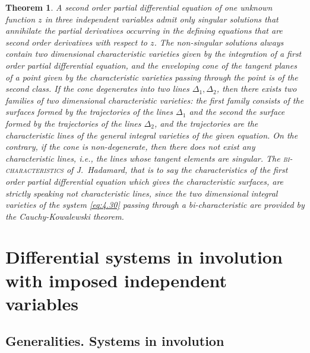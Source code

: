 \documentclass[leqno,11pt]{book}
\numberwithin{equation}{chapter}
\theoremstyle{shape1}
\newtheorem*{thm*}{\hspace{15pt}Theorem}
\theoremstyle{shape0}
\theoremstyle{shape2}
\theoremstyle{definition}
\begin{document}
\begin{thm*}
  A second order partial differential equation of one unknown function $z$ in three independent variables admit only singular solutions that annihilate the partial derivatives occurring in the defining equations that are second order derivatives with respect to $z$. The non-singular solutions always contain two dimensional characteristic varieties given by the integration of a first order partial differential equation, and the enveloping cone of the tangent planes of a point given by the characteristic varieties passing through the point is of the second class. If the cone degenerates into two lines $\Delta_{1},\Delta_{2}$, then there exists two families of two dimensional characteristic varieties: the first family consists of the surfaces formed by the trajectories of the lines $\Delta_{1}$ and the second the surface formed by the trajectories of the lines $\Delta_{2}$, and the trajectories are the characteristic lines of the general integral varieties of the given equation. On the contrary, if the cone is non-degenerate, then there does not exist any characteristic lines, i.e., the lines whose tangent elements are singular. The \textsc{bi-characteristics} of J.~Hadamard, that is to say the characteristics of the first order partial differential equation which gives the characteristic surfaces, are strictly speaking not characteristic lines, since the two dimensional integral varieties of the system \eqref{eq:4.30} passing through a bi-characteristic are provided by the Cauchy-Kowalewski theorem.
\end{thm*}

\chapter{Differential systems in involution with imposed independent variables}
\label{cha:diff-syst-invol}

\section{Generalities. Systems in involution}
\label{sec:gener-syst-invol}
\end{document}
